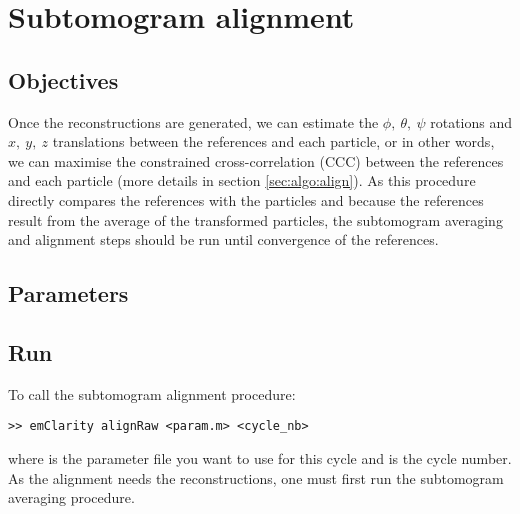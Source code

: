 \section{Subtomogram alignment} \label{sec:align}

\subsection{Objectives}
Once the reconstructions are generated, we can estimate the $\phi,\ \theta,\ \psi$ rotations and $x,\ y,\ z$ translations between the references and each particle, or in other words, we can maximise the constrained cross-correlation (CCC) between the references and each particle (more details in section \ref{sec:algo:align}). As this procedure directly compares the references with the particles and because the references result from the average of the transformed particles, the subtomogram averaging and alignment steps should be run until convergence of the references.

\subsection{Parameters}


\subsection{Run} \label{sec:align:run}

To call the subtomogram alignment procedure:
\begin{lstlisting}
>> emClarity alignRaw <param.m> <cycle_nb>
\end{lstlisting}
where  is the parameter file you want to use for this cycle and  is the cycle number. As the alignment needs the reconstructions, one must first run the subtomogram averaging procedure.

